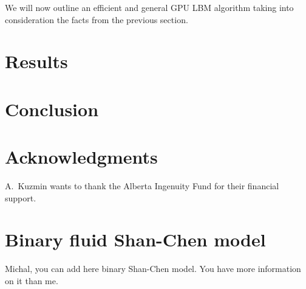 \documentclass[mathpazo]{cicp}
\begin{document}
We will now outline an efficient and general GPU LBM algorithm taking into consideration
the facts from the previous section.

\section{Results}
\label{sec:benchmark}

\section{Conclusion}
\section*{Acknowledgments}
A.~Kuzmin wants to thank the Alberta Ingenuity Fund for their financial support.

\appendix
\section{Binary fluid Shan-Chen model}
\label{sec:binary_shan_chen}
{\color{red} Michal, you can add here binary Shan-Chen model. You have more information on it than me.}
\end{document}
